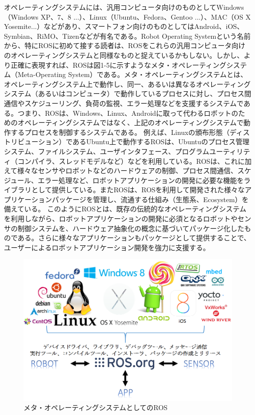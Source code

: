 オペレーティングシステムには、汎用コンピュータ向けのものとしてWindows（Windows XP、7、8 ...）、Linux（Ubuntu、Fedora、Gentoo ...）、MAC（OS X Yosemite...）などがあり、スマートフォン向けのものとしてはAndroid、iOS、Symbian、RiMO、Tizenなどが有名である。Robot Operating Systemという名前から、特にROSに初めて接する読者は、ROSをこれらの汎用コンピュータ向けのオペレーティングシステムと同様なものと捉えているかもしない。しかし、より正確に表現すれば、ROSは図1-5に示すようなメタ・オペレーティングシステム（Meta-Operating System）である。メタ・オペレーティングシステムとは、オペレーティングシステム上で動作し、同一、あるいは異なるオペレーティングシステム（あるいはコンピュータ）で動作しているプロセスに対し、プロセス間通信やスケジューリング、負荷の監視、エラー処理などを支援するシステムである。つまり、ROSは、Windows、Linux、Androidに取って代わるロボットのためのオペレーティングシステムではなく、上記のオペレーティングシステムで動作するプロセスを制御するシステムである。
例えば、Linuxの頒布形態（ディストリビューション）であるUbuntu上で動作するROSは、Ubuntuのプロセス管理システム、ファイルシステム、ユーザインタフェース、プログラムユーティリティ（コンパイラ、スレッドモデルなど）などを利用している。ROSは、これに加えて様々なセンサやロボットなどのハードウェアの制御、プロセス間通信、スケジュール、エラー処理など、ロボットアプリケーションの開発に必要な機能をライブラリとして提供している。またROSは、ROSを利用して開発された様々なアプリケーションパッケージを管理し、流通する仕組み（生態系、Ecosystem）を備えている。
このようにROSとは、既存の伝統的なオペレーティングシステムを利用しながら、ロボットアプリケーションの開発に必須となるロボットやセンサの制御システムを、ハードウェア抽象化の概念に基づいてパッケージ化したものである。さらに様々なアプリケーションもパッケージとして提供することで、ユーザーによるロボットアプリケーション開発を強力に支援する。

\begin{figure}[h]
  \centering
  \includegraphics[width=\columnwidth]{pictures/chapter1/pic_01_01.png}
  \caption{メタ・オペレーティングシステムとしてのROS}
\end{figure}


